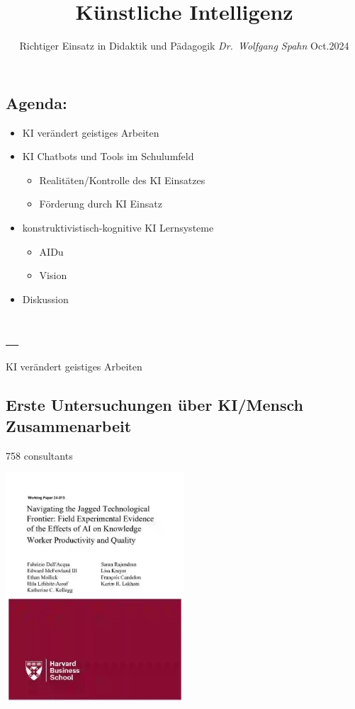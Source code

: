 \documentclass[
  letterpaper,
  DIV=11,
  numbers=noendperiod]{scrartcl}
\title{Künstliche Intelligenz}
\subtitle{Richtiger Einsatz in Didaktik und Pädagogik \emph{Dr.~Wolfgang
Spahn} Oct.2024}
\author{}
\date{}
\providecommand{\tightlist}{%
  \setlength{\itemsep}{0pt}\setlength{\parskip}{0pt}}\usepackage{longtable,booktabs,array}
\begin{document}
\maketitle


\subsection{Agenda:}\label{agenda}

\begin{itemize}
\tightlist
\item
  KI verändert geistiges Arbeiten
\item
  KI Chatbots und Tools im Schulumfeld

  \begin{itemize}
  \tightlist
  \item
    Realitäten/Kontrolle des KI Einsatzes
  \item
    Förderung durch KI Einsatz
  \end{itemize}
\item
  konstruktivistisch-kognitive KI Lernsysteme

  \begin{itemize}
  \tightlist
  \item
    AIDu
  \item
    Vision
  \end{itemize}
\item
  Diskussion
\end{itemize}

\subsection{\_}\label{section}

KI verändert geistiges Arbeiten

\subsection{Erste Untersuchungen über KI/Mensch
Zusammenarbeit}\label{erste-untersuchungen-uxfcber-kimensch-zusammenarbeit}

758 consultants

\includegraphics[width=0.5\textwidth,height=\textheight]{images/havardBusinessSchool.webp}
\end{document}
